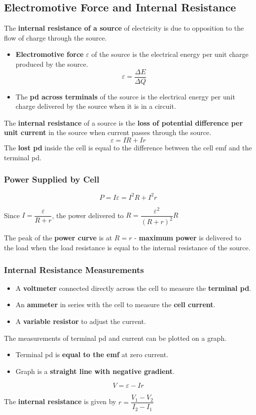 \subsection{Electromotive Force and Internal Resistance}

The \textbf{internal resistance of a source} of electricity is due to opposition to the flow of charge through the source.
\begin{itemize}
    \item \textbf{Electromotive force} $\varepsilon$ of the source is the electrical energy per unit charge produced by the source.
        $$\varepsilon=\frac{\Delta E}{\Delta Q}$$
    \item The \textbf{pd across terminals} of the source is the electrical energy per unit charge delivered by the source when it is in a circuit.
\end{itemize}

The \textbf{internal resistance} of a source is the \textbf{loss of potential difference per unit current} in the source when current passes through the source.
$$\varepsilon=IR+Ir$$
The \textbf{lost pd} inside the cell is equal to the difference between the cell emf and the terminal pd.

\subsubsection*{Power Supplied by Cell}
$$P=I\varepsilon=I^2R+I^2r$$

Since $I=\dfrac{\varepsilon}{R+r}$, the power delivered to $R=\dfrac{\varepsilon^2}{(R+r)^2}R$

The peak of the \textbf{power curve} is at $R=r$ - \textbf{maximum power} is delivered to the load when the load resistance is equal to the internal resistance of the source.

\subsubsection*{Internal Resistance Measurements}

\begin{itemize}
    \item A \textbf{voltmeter} connected directly across the cell to measure the \textbf{terminal pd}.
    \item An \textbf{ammeter} in series with the cell to measure the \textbf{cell current}.
    \item A \textbf{variable resistor} to adjust the current.
\end{itemize}

The measurements of terminal pd and current can be plotted on a graph.
\begin{itemize}
    \item Terminal pd is \textbf{equal to the emf} at zero current.
    \item Graph is a \textbf{straight line with negative gradient}.
\end{itemize}
$$V=\varepsilon-Ir$$

The \textbf{internal resistance} is given by $r=\dfrac{V_1-V_2}{I_2-I_1}$
